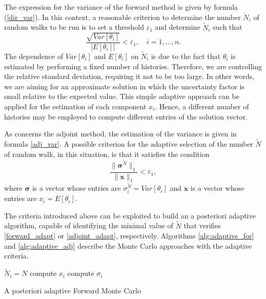\documentclass[times]{nlaauth}
\begin{document}
The expression for the variance of the forward method is given by
formula (\ref{dir_var}).
In this context, a reasonable criterion to determine the number $\tilde{N}_i$
of random walks to be run is to set a threshold $\varepsilon_1$ and determine
$\tilde{N}_i$ such that
\begin{equation}
\frac{\sqrt{Var[\theta_i]}}{\lvert
E[\theta_i]\rvert}<\varepsilon_1, \quad i=1,\ldots,n.
\label{forward_adapt}
\end{equation}
The dependence of $Var[\theta_i]$ and $E[\theta_i]$ on $\tilde{N}_i$
is due to the fact that
$\theta_i$ is estimated by performing a fixed  number of histories.
Therefore, we are controlling the relative standard deviation, requiring it not
to be too large. In other words, we are aiming for an approximate solution in which
the uncertainty factor is small relative to the expected value.
This simple adaptive approach can be applied for the estimation of each
component $x_i$. Hence, a different number of histories may be employed to
compute different entries of the solution vector.

As concerns the adjoint method, the estimation of the variance is
given in formula \eqref{adj_var}.
A possible criterion for the adaptive selection of the number $\tilde{N}$ of random
walk, in this situation, is that it satisfies the condition
\begin{equation}
\frac{\lVert
\boldsymbol{\sigma}^{\tilde{N}}\rVert_1}{\lVert
\mathbf{x}\rVert_1}<\varepsilon_1,
\label{adjoint_adapt}
\end{equation}
where $\boldsymbol{\sigma}$ is a vector whose entries are
$\sigma^{\tilde{N}}_i=Var[\theta_i]$ and $\mathbf{x}$ is a vector whose entries
are $x_i = E[\theta_i]$.

The criteria introduced above can be exploited to build
an a posteriori adaptive algorithm, capable of identifying the minimal value of
$\tilde{N}$ that verifies \eqref{forward_adapt} or \eqref{adjoint_adapt},
respectively.
Algorithms \ref{alg:adaptive_for} and \ref{alg:adaptive_adj} describe
the Monte Carlo approaches with the adaptive criteria.

\begin{algorithm}[H]
\LinesNumbered
 {
 $\tilde{N}_i=N$\;
 compute $x_i$\;
 compute $\sigma_i$\;
 }
 \caption{A posteriori adaptive Forward Monte Carlo \label{alg:adaptive_for}}
\end{algorithm}
\end{document}
